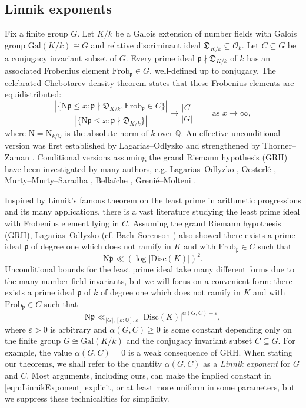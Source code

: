 \documentclass[12pt]{amsart}
\theoremstyle{definition} \newtheorem{definition}[theorem]{Definition}
\theoremstyle{example} \newtheorem{example}[theorem]{Example}
\theoremstyle{remark} \newtheorem{remark}{Remark}[theorem]
\numberwithin{equation}{section}
\numberwithin{theorem}{section}
\renewcommand{\epsilon}{\varepsilon}
\renewcommand{\leq}{\leqslant}
\renewcommand{\geq}{\geqslant}
\newcommand{\N}{\mathrm{N}} %
\newcommand{\Q}{\mathbb{Q}}
\newcommand{\kp}{\mathfrak{p}}
\newcommand{\kD}{\mathfrak{D}}
\newcommand{\Gal}{\mathrm{Gal}}
\newcommand{\Frob}{\mathrm{Frob}}
\newcommand{\Disc}{\mathrm{Disc}}
\begin{document}
\subsection{Linnik exponents} 
	Fix a finite group $G$.  Let $K/k$ be a Galois extension of number fields with Galois group $\Gal(K/k) \cong G$ and relative discriminant ideal $\kD_{K/k} \subseteq  \mathcal{O}_k$. Let $C \subseteq G$ be a conjugacy invariant subset of $G$. Every prime ideal $\kp \nmid \kD_{K/k}$ of $k$ has an associated Frobenius element $\Frob_{\kp} \in G$, well-defined up to conjugacy. The celebrated Chebotarev density theorem states that these Frobenius elements are equidistributed:
	\[
	\frac{|\{ \N\kp \leq x : \kp \nmid \kD_{K/k}, \Frob_{\kp} \in C \}|}{|\{ \N\kp \leq x  : \kp \nmid \kD_{K/k} \}|} \longrightarrow \frac{|C|}{|G|} \qquad \text{ as } x \to \infty,
	\]
	where $\N = \mathrm{N}_{k/\Q}$ is the absolute norm of $k$ over $\Q$. 
	An effective unconditional version was first established by Lagarias--Odlyzko \cite{LagariasOdlyzko-EffectiveChebotarev} and strengthened by Thorner--Zaman \cite{ThornerZaman-Unified}. Conditional versions assuming the grand Riemann hypothesis (GRH) have been investigated by many authors, e.g. 
	Lagarias--Odlyzko \cite{LagariasOdlyzko-EffectiveChebotarev}, Oesterl\'e \cite{Oesterle-CDTGRH}, Murty--Murty--Saradha \cite{MurtyMurtySaradha-ChebotarevI}, Bella\"{i}che \cite{Bellaiche-Chebotarev}, Greni\'{e}--Molteni \cite{GrenieMolteni-ExplicitCDTGRH}. 
	
	
	Inspired by Linnik's famous theorem on the least prime in arithmetic progressions and its many applications, there is a vast literature studying the least prime ideal with Frobenius element lying in $C$. Assuming the grand Riemann hypothesis (GRH), Lagarias--Odlyzko \cite{LagariasOdlyzko-EffectiveChebotarev} (cf. Bach--Sorenson \cite{BachSorenson-ResidueClasses}) also showed there exists a prime ideal $\kp$ of degree one which does not ramify in $K$ and with $\Frob_{\kp} \in C$ such that 
	\[
	\N\kp \ll (\log |\Disc(K)|)^2.
	\]
	Unconditional bounds for the least prime ideal take many different forms due to the many number field invariants, but we will focus on a convenient form: there exists a prime ideal $\kp$ of $k$ of degree one which does not ramify in $K$ and with $\Frob_{\kp} \in C$ such that 
	\begin{equation} \label{eqn:LinnikExponent}
	\N\kp \ll_{|G|,[k:\Q],\epsilon} |\Disc(K)|^{\alpha(G,C)+\epsilon},		
	\end{equation}
	where $\epsilon > 0$ is arbitrary and $\alpha(G,C) \geq 0$ is some constant depending only on the finite group $G \cong \Gal(K/k)$ and the conjugacy invariant subset $C \subseteq G$. For example, the value $\alpha(G,C) = 0$ is a weak consequence of GRH. When stating our theorems, we shall refer to the quantity $\alpha(G,C)$ as a \textit{Linnik exponent} for $G$ and $C$. Most arguments, including ours, can make the implied constant in \eqref{eqn:LinnikExponent} explicit, or at least more uniform in some parameters, but we suppress these technicalities for simplicity.
	
\end{document}
